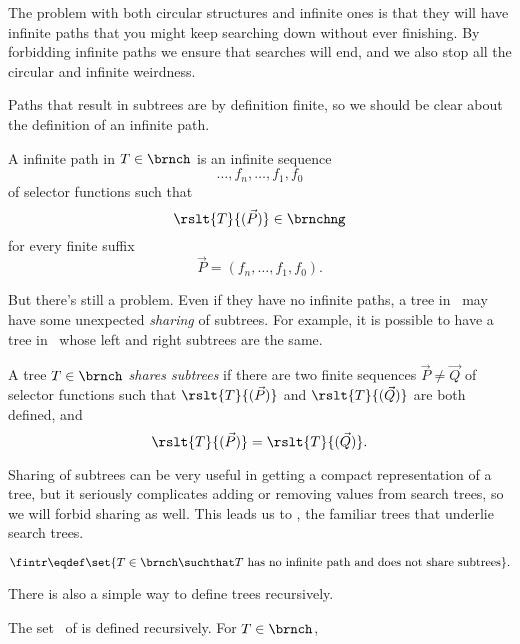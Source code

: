 \begin{definition}
\begin{figure}
\label{inftree123}

\end{figure}

The problem with both circular structures and infinite ones is that
they will have infinite paths that you might keep searching down
without ever finishing.  By forbidding infinite paths we ensure that
searches will end, and we also stop all the circular and infinite
weirdness.

Paths that result in subtrees are by definition finite, so we should
be clear about the definition of an infinite path.

\begin{definition}
A infinite path in $T \in \brnch$ is an infinite sequence
\[
\dots,f_n,\dots,f_1,f_0
\]
of selector functions such that
\[
\rslt{T}{(\vec{P})} \in \brnchng
\]
for every finite suffix
\[
\vec{P} = (f_n,\dots, f_1,f_0).
\]
\end{definition}

But there's still a problem.  Even if they
have no infinite paths, a tree in \brnch\ may have some unexpected
\emph{sharing} of subtrees.  For example, it is possible to have a
tree in \brnch\ whose left and right subtrees are the same.



\begin{definition}
A tree $T \in \brnch$ \emph{shares subtrees} if there are two finite
sequences $\vec{P} \neq \vec{Q}$ of selector functions such that
$\rslt{T}{(\vec{P})}$ and $\rslt{T}{(\vec{Q})}$ are both defined, and
\[
\rslt{T}{(\vec{P})}=\rslt{T}{(\vec{Q})}.
\]
\end{definition}
Sharing of subtrees can be very useful in getting a compact
representation of a tree, but it seriously complicates adding or
removing values from search trees, so we will forbid sharing as well.
This leads us to \fintr, the familiar trees that underlie search
trees.
\begin{definition}
\[
\fintr \eqdef \set{T \in \brnch \suchthat T\ \text{has no infinite path and
  does not share subtrees}}.
\]
\end{definition}

There is also a simple way to define trees recursively.

\begin{definition}\label{def:rectree}
The set \rectr\ of  is defined recursively.  For
$T \in \brnch$,


\end{definition}
\end{definition}
